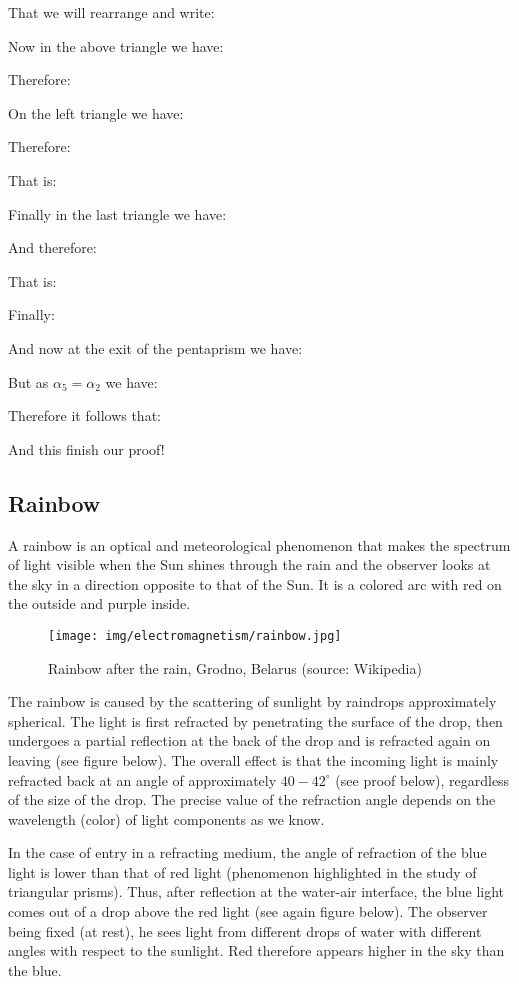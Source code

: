 	That we will rearrange and write:
	
	Now in the above triangle we have:
	
	Therefore:
	
	On the left triangle we have:
	
	Therefore:
	
	That is:
	
	Finally in the last triangle we have:
	
	And therefore:
	
	That is:
	
	Finally:
	
	And now at the exit of the pentaprism we have:
	
	But as $\alpha_5=\alpha_2$ we have:
	
	Therefore it follows that:
	
	And this finish our proof!
	
	\pagebreak
	\subsection{Rainbow}
	A rainbow is an optical and meteorological phenomenon that makes the spectrum of light visible  when the Sun shines through the rain and the observer looks at the sky in a direction opposite to that of the Sun. It is a colored arc with red on the outside and purple inside.
	\begin{figure}[H]
		\centering
		\texttt{[image: img/electromagnetism/rainbow.jpg]}
		\caption[Rainbow after the rain]{Rainbow after the rain, Grodno, Belarus (source: Wikipedia)}
	\end{figure}
	The rainbow is caused by the scattering of sunlight by raindrops approximately spherical. The light is first refracted by penetrating the surface of the drop, then undergoes a partial reflection at the back of the drop and is refracted again on leaving (see figure below). The overall effect is that the incoming light is mainly refracted back at an angle of approximately $40-42^\circ$  (see proof below), regardless of the size of the drop. The precise value of the refraction angle depends on the wavelength (color) of light components as we know. 

	In the case of entry in a refracting medium, the angle of refraction of the blue light is lower than that of red light (phenomenon highlighted in the study of triangular prisms). Thus, after reflection at the water-air interface, the blue light comes out of a drop above the red light (see again figure below). The observer being fixed (at rest), he sees light from different drops of water with different angles with respect to the sunlight. Red therefore appears higher in the sky than the blue.
	
